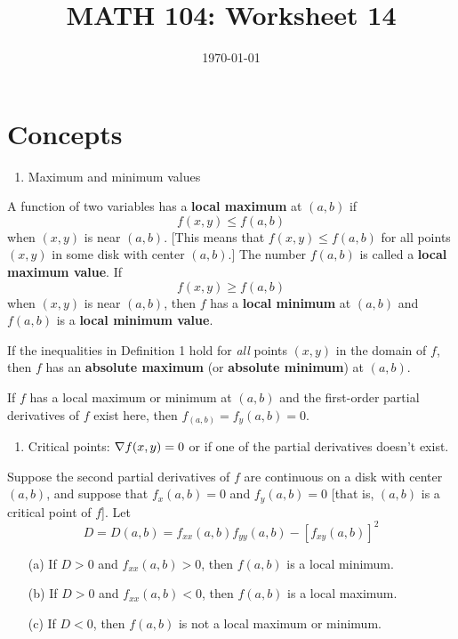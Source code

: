 \documentclass[12pt]{amsart}
\title{ MATH 104: Worksheet 14}
\author{}
\date{\today}
\begin{document}
\maketitle

\section{Concepts}

\begin{enumerate}
	\item Maximum and minimum values
\end{enumerate}

A function of two variables has a \textbf{local maximum} at $(a, b)$ if
\[
	f(x, y) \leq f(a, b)
\]
when $(x, y)$ is near $(a, b)$. [This means that $f(x, y) \leq f(a, b)$ for all points $(x, y)$ in some disk with center $(a, b)$.] The number $f(a, b)$ is called a \textbf{local maximum value}. If
\[
	f(x, y) \geq f(a, b)
\]
when $(x, y)$ is near $(a, b)$, then $f$ has a \textbf{local minimum} at $(a, b)$ and $f(a, b)$ is a \textbf{local minimum value}.


If the inequalities in Definition 1 hold for \textit{all} points $(x, y)$ in the domain of $f$, then $f$ has an \textbf{absolute maximum} (or \textbf{absolute minimum}) at $(a, b)$.

\begin{theorem}
	If $f$ has a local maximum or minimum at $(a,b)$ and the first-order partial derivatives of $f$
	exist here, then $f_(a,b) = f_y(a,b) = 0$.
\end{theorem}

\begin{enumerate}
	\item Critical points: $\nabla f (x,y) = 0$ or if one of the partial
	      derivatives doesn't exist.
\end{enumerate}

\begin{theorem}
	Suppose the second partial derivatives of \( f \) are continuous on a disk with center \( (a, b) \), and suppose that
	\( f_x(a, b) = 0 \) and \( f_y(a, b) = 0 \) [that is, \( (a, b) \) is a critical point of \( f \)]. Let
	\[
		D = D(a, b) = f_{xx}(a, b) f_{yy}(a, b) - [f_{xy}(a, b)]^2
	\]

	\begin{itemize}
		\item[(a)] If \( D > 0 \) and \( f_{xx}(a, b) > 0 \), then \( f(a, b) \) is a local minimum.
		\item[(b)] If \( D > 0 \) and \( f_{xx}(a, b) < 0 \), then \( f(a, b) \) is a local maximum.
		\item[(c)] If \( D < 0 \), then \( f(a, b) \) is not a local maximum or minimum.
	\end{itemize}
\end{theorem}
\end{document}
